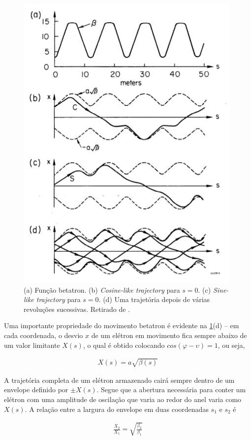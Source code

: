 \begin{figure}[!htb]
	\centering
	\includegraphics[width=0.7\linewidth]{./Figuras/fig12.jpeg}
	\caption{(a) Função betatron. (b) \textit{Cosine-like trajectory} para $s=0$. (c) \textit{Sine-like trajectory} para $s=0$. (d) Uma trajetória depois de várias revoluções sucessivas. Retirado de \cite{sands1970physics}.}
	\label{fig:fig12}
\end{figure}
	
Uma importante propriedade do movimento betatron é evidente na \ref{fig:fig12}(d) -- em cada coordenada, o desvio $x$ de um elétron em movimento fica sempre abaixo de um valor limitante $X(s)$, o qual é obtido colocando $cos(\varphi-\upsilon)=1$, ou seja,
	
\begin{align}
	X(s) = a\sqrt{\beta(s)}
\end{align}
	
A trajetória completa de um elétron armazenado cairá sempre dentro de um envelope definido por $\pm X(s)$. Segue que a abertura necessária para conter um elétron com uma amplitude de oscilação que varia ao redor do anel varia como $X(s)$. A relação entre a largura do envelope em duas coordenadas $s_1$ e $s_2$ é
	
\begin{align}
	\frac{X_2}{X_1} = \sqrt{\frac{\beta_2}{\beta_1}}
\end{align}
	

